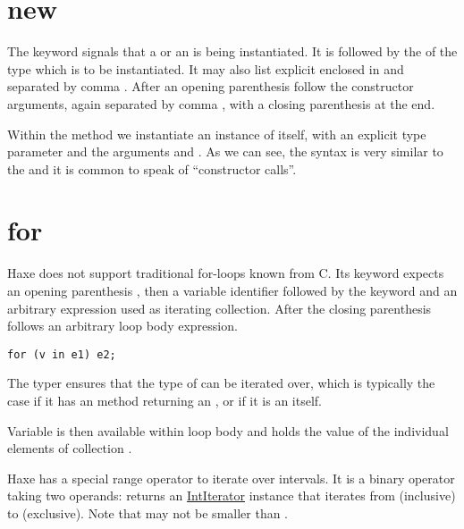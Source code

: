 \section{new}
\label{expression-new}

The  keyword signals that a  or an  is being instantiated. It is followed by the  of the type which is to be instantiated. It may also list explicit  enclosed in \expr{<>} and separated by comma \expr{,}. After an opening parenthesis \expr{(} follow the constructor arguments, again separated by comma \expr{,}, with a closing parenthesis \expr{)} at the end.


Within the  method we instantiate an instance of  itself, with an explicit type parameter  and the arguments  and . As we can see, the syntax is very similar to the  and it is common to speak of ``constructor calls''.



\section{for}
\label{expression-for}

Haxe does not support traditional for-loops known from C. Its  keyword expects an opening parenthesis \expr{(}, then a variable identifier followed by the keyword  and an arbitrary expression used as iterating collection. After the closing parenthesis \expr{)} follows an arbitrary loop body expression.

\begin{lstlisting}
for (v in e1) e2;
\end{lstlisting}

The typer ensures that the type of  can be iterated over, which is typically the case if it has an   method returning an , or if it is an  itself.

Variable  is then available within loop body  and holds the value of the individual elements of collection .

Haxe has a special range operator to iterate over intervals. It is a binary operator taking two  operands:  returns an \href{http://api.haxe.org/IntIterator.html}{IntIterator} instance that iterates from  (inclusive) to  (exclusive). Note that  may not be smaller than .


